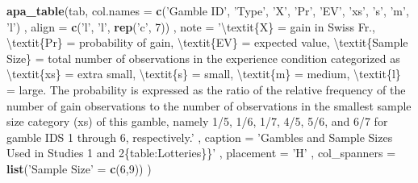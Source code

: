\documentclass[]{standalone}
\newenvironment{Shaded}{\begin{snugshade}}{\end{snugshade}}
\newcommand{\CharTok}[1]{\textcolor[rgb]{0.31,0.60,0.02}{#1}}
\newcommand{\DataTypeTok}[1]{\textcolor[rgb]{0.13,0.29,0.53}{#1}}
\newcommand{\DecValTok}[1]{\textcolor[rgb]{0.00,0.00,0.81}{#1}}
\newcommand{\KeywordTok}[1]{\textcolor[rgb]{0.13,0.29,0.53}{\textbf{#1}}}
\newcommand{\NormalTok}[1]{#1}
\newcommand{\StringTok}[1]{\textcolor[rgb]{0.31,0.60,0.02}{#1}}
\begin{document}
\begin{Shaded}
\begin{Highlighting}[]
\KeywordTok{apa_table}\NormalTok{(tab,}
  \DataTypeTok{col.names =} \KeywordTok{c}\NormalTok{(}\StringTok{'Gamble ID'}\NormalTok{, }\StringTok{'Type'}\NormalTok{, }\StringTok{'X'}\NormalTok{, }\StringTok{'Pr'}\NormalTok{, }\StringTok{'EV'}\NormalTok{, }\StringTok{'xs'}\NormalTok{, }\StringTok{'s'}\NormalTok{, }\StringTok{'m'}\NormalTok{, }\StringTok{'l'}\NormalTok{)}
\NormalTok{  , }\DataTypeTok{align =} \KeywordTok{c}\NormalTok{(}\StringTok{'l'}\NormalTok{, }\StringTok{'l'}\NormalTok{, }\KeywordTok{rep}\NormalTok{(}\StringTok{'c'}\NormalTok{, }\DecValTok{7}\NormalTok{))}
\NormalTok{  , }\DataTypeTok{note =} \StringTok{'}\CharTok{\textbackslash{}t}\StringTok{extit\{X\} = gain in Swiss Fr., }\CharTok{\textbackslash{}t}\StringTok{extit\{Pr\} = probability of gain, }\CharTok{\textbackslash{}t}\StringTok{extit\{EV\} = expected value, }\CharTok{\textbackslash{}t}\StringTok{extit\{Sample Size\} = total number of observations in the experience condition categorized as }\CharTok{\textbackslash{}t}\StringTok{extit\{xs\} = extra small, }\CharTok{\textbackslash{}t}\StringTok{extit\{s\} = small, }\CharTok{\textbackslash{}t}\StringTok{extit\{m\} = medium, }\CharTok{\textbackslash{}t}\StringTok{extit\{l\} = large. The probability is expressed as the ratio of the relative frequency of the number of gain observations to the number of observations in the smallest sample size category (xs) of this gamble, namely 1/5, 1/6, 1/7, 4/5, 5/6, and 6/7 for gamble IDS 1 through 6, respectively.'}
\NormalTok{  , }\DataTypeTok{caption =} \StringTok{'Gambles and Sample Sizes Used in Studies 1 and 2\{table:Lotteries\}\}'}
\NormalTok{  , }\DataTypeTok{placement =} \StringTok{'H'}
\NormalTok{  , }\DataTypeTok{col_spanners =} \KeywordTok{list}\NormalTok{(}\StringTok{'Sample Size'}\NormalTok{ =}\StringTok{ }\KeywordTok{c}\NormalTok{(}\DecValTok{6}\NormalTok{,}\DecValTok{9}\NormalTok{))}
\NormalTok{  )}
\end{Highlighting}
\end{Shaded}
\end{document}
